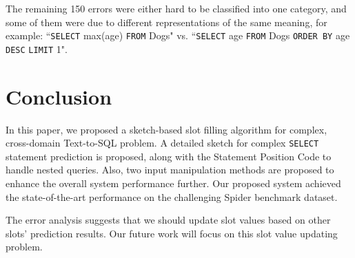 \documentclass[11pt,a4paper]{article}
\begin{document}
The remaining 150 errors were either hard to be classified into one category, and some of them were due to different representations of the same meaning, for example: ``\texttt{SELECT} max(age) \texttt{FROM} Dogs" vs. ``\texttt{SELECT} age \texttt{FROM} Dogs \texttt{ORDER BY} age \texttt{DESC} \texttt{LIMIT} 1".

\section{Conclusion}
In this paper, we proposed a sketch-based slot filling algorithm for complex, cross-domain Text-to-SQL problem. A detailed sketch for complex \texttt{SELECT} statement prediction is proposed, along with the Statement Position Code to handle nested queries. Also, two input manipulation methods are proposed to enhance the overall system performance further. Our proposed system achieved the state-of-the-art performance on the challenging Spider benchmark dataset.

The error analysis suggests that we should update slot values based on other slots' prediction results. Our future work will focus on this slot value updating problem.




\end{document}
